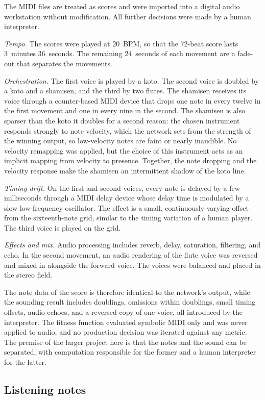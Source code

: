 \documentclass[conference]{IEEEtran}
\begin{document}
The MIDI files are treated as scores and were imported into a digital audio workstation without modification. All further decisions were made by a human interpreter.

\emph{Tempo.} The scores were played at 20~BPM, so that the 72-beat score lasts 3~minutes 36~seconds. The remaining 24~seconds of each movement are a fade-out that separates the movements.

\emph{Orchestration.} The first voice is played by a koto. The second voice is doubled by a koto and a shamisen, and the third by two flutes. The shamisen receives its voice through a counter-based MIDI device that drops one note in every twelve in the first movement and one in every nine in the second. The shamisen is also sparser than the koto it doubles for a second reason: the chosen instrument responds strongly to note velocity, which the network sets from the strength of the winning output, so low-velocity notes are faint or nearly inaudible. No velocity remapping was applied, but the choice of this instrument acts as an implicit mapping from velocity to presence. Together, the note dropping and the velocity response make the shamisen an intermittent shadow of the koto line.

\emph{Timing drift.} On the first and second voices, every note is delayed by a few milliseconds through a MIDI delay device whose delay time is modulated by a slow low-frequency oscillator. The effect is a small, continuously varying offset from the sixteenth-note grid, similar to the timing variation of a human player. The third voice is played on the grid.

\emph{Effects and mix.} Audio processing includes reverb, delay, saturation, filtering, and echo. In the second movement, an audio rendering of the flute voice was reversed and mixed in alongside the forward voice. The voices were balanced and placed in the stereo field.

The note data of the score is therefore identical to the network's output, while the sounding result includes doublings, omissions within doublings, small timing offsets, audio echoes, and a reversed copy of one voice, all introduced by the interpreter. The fitness function evaluated symbolic MIDI only and was never applied to audio, and no production decision was iterated against any metric. The premise of the larger project here is that the notes and the sound can be separated, with computation responsible for the former and a human interpreter for the latter.

\subsection{Listening notes}
\end{document}
